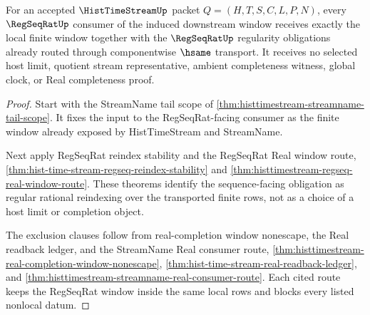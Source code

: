 \begin{theorem}
\label{thm:histtimestream-regseqrat-window-exactness}
For an accepted $\HistTimeStreamUp$ packet $Q=(H,T,S,C,L,P,N)$, every $\RegSeqRatUp$ consumer of the induced downstream window receives exactly the local finite window together with the $\RegSeqRatUp$ regularity obligations already routed through componentwise $\hsame$ transport. It receives no selected host limit, quotient stream representative, ambient completeness witness, global clock, or Real completeness proof.
\end{theorem}
\begin{proof}
Start with the StreamName tail scope of \autoref{thm:histtimestream-streamname-tail-scope}. It fixes the input to the RegSeqRat-facing consumer as the finite window already exposed by HistTimeStream and StreamName.

Next apply RegSeqRat reindex stability and the RegSeqRat Real window route, \autoref{thm:hist-time-stream-regseq-reindex-stability} and \autoref{thm:histtimestream-regseq-real-window-route}. These theorems identify the sequence-facing obligation as regular rational reindexing over the transported finite rows, not as a choice of a host limit or completion object.

The exclusion clauses follow from real-completion window nonescape, the Real readback ledger, and the StreamName Real consumer route, \autoref{thm:histtimestream-real-completion-window-nonescape}, \autoref{thm:hist-time-stream-real-readback-ledger}, and \autoref{thm:histtimestream-streamname-real-consumer-route}. Each cited route keeps the RegSeqRat window inside the same local rows and blocks every listed nonlocal datum.
\end{proof}

